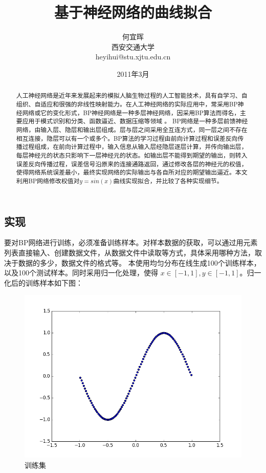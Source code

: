 \documentclass[twocolumn]{article}
\date{2011年3月}
\title{基于神经网络的曲线拟合}
\author{何宜晖\\西安交通大学\\heyihui@stu.xjtu.edu.cn}
\begin{document}
\begin{CJK}{UTF8}{gkai}
\maketitle

\begin{abstract}
人工神经网络是近年来发展起来的模拟人脑生物过程的人工智能技术，具有自学习、自组织、自适应和很强的非线性映射能力。在人工神经网络的实际应用中，常采用BP神经网络或它的变化形式，BP神经网络是一种多层神经网络，因采用BP算法而得名，主要应用于模式识别和分类、函数逼近、数据压缩等领域 \cite{bao2010} 。  
BP网络是一种多层前馈神经网络，由输入层、隐层和输出层组成。层与层之间采用全互连方式，同一层之间不存在相互连接，隐层可以有一个或多个。BP算法的学习过程由前向计算过程和误差反向传播过程组成，在前向计算过程中，输入信息从输入层经隐层逐层计算，并传向输出层，每层神经元的状态只影响下一层神经元的状态。如输出层不能得到期望的输出，则转入误差反向传播过程，误差信号沿原来的连接通路返回，通过修改各层的神经元的权值，使得网络系统误差最小，最终实现网络的实际输出与各自所对应的期望输出逼近。本文利用BP网络修改权值对$y=sin(x)$曲线实现拟合，并比较了各种实现细节。
\end{abstract}

\section{实现}
要对BP网络进行训练，必须准备训练样本。对样本数据的获取，可以通过用元素列表直接输入、创建数据文件，从数据文件中读取等方式，具体采用哪种方法，取决于数据的多少，数据文件的格式等。  本使用均匀分布在线生成100个训练样本，以及100个测试样本。同时采用归一化处理，使得 $x \in [-1, 1], y\in [-1, 1]$。归一化后的训练样本如下图：

\begin{figure}
	\centering
	\includegraphics[width=\linewidth]{../scatter}
	\caption{训练集}
	\label{fig:fig0}
\end{figure}


\end{CJK}
\end{document}
